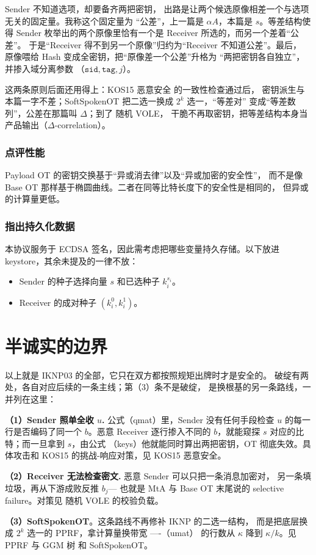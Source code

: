 Sender 不知道选项，却要备齐两把密钥，
出路是让两个候选原像相差一个与选项无关的固定量。我称这个固定量为
“公差”，上一篇是 $\alpha A$，本篇是 $s$。等差结构使得 Sender
枚举出的两个原像里恰有一个是 Receiver 所选的，而另一个差着“公差”。
于是“Receiver 得不到另一个原像”归约为“Receiver 不知道公差”。最后，
原像喂给 Hash 变成全密钥，把“原像差一个公差”升格为
“两把密钥各自独立”，并掺入域分离参数
（$\mathtt{sid}, \mathtt{tag}, j$）。

这两条原则后面还用得上：KOS15 恶意安全 的一致性检查通过后，
密钥派生与本篇一字不差；SoftSpokenOT 把二选一换成 $2^k$ 选一，“等差对”
变成“等差数列”，公差在那篇叫 $\Delta$；到了 随机 VOLE，
干脆不再取密钥，把等差结构本身当产品输出（$\Delta$-correlation）。

\subsubsection{点评性能}

Payload OT 的密钥交换基于“异或消去律”以及“异或加密的安全性”，
而不是像 Base OT 那样基于椭圆曲线。二者在同等比特长度下的安全性是相同的，
但异或的计算量更低。

\subsubsection{指出持久化数据}

本协议服务于 ECDSA 签名，因此需考虑把哪些变量持久存储。以下放进
keystore，其余未提及的一律不放：

\begin{itemize}

\item
  Sender 的种子选择向量 $s$ 和已选种子 $k_i^{s_i}$。
\item
  Receiver 的成对种子 $(k_i^0, k_i^1)$。
\end{itemize}

\section{半诚实的边界}

以上就是 IKNP03 的全部，它只在双方都按照规矩出牌时才是安全的。
破绽有两处，各自对应后续的一条主线；第（3）条不是破绽，
是换根基的另一条路线，一并列在这里：

\textbf{（1）Sender 照单全收 $u$.} 公式（qmat）里，Sender
没有任何手段检查 $u$ 的每一行是否编码了同一个 $b$。恶意 Receiver
逐行掺入不同的 $b$，就能窥探 $s$ 对应的比特；而一旦拿到 $s$，由公式
（keys）他就能同时算出两把密钥，OT 彻底失效。具体攻击和 KOS15
的挑战-响应对策，见 KOS15 恶意安全。

\textbf{（2）Receiver 无法检查密文.} 恶意 Sender 可以只把一条消息加密对，
另一条填垃圾，再从下游成败反推 $b_j$--- 也就是 MtA 与 Base OT 末尾说的
selective failure。对策见 随机 VOLE 的校验负载。

\textbf{（3）SoftSpokenOT}。这条路线不再修补 IKNP 的二选一结构，
而是把底层换成 $2^k$ 选一的 PPRF，拿计算量换带宽 ----（umat）
的行数从 $\kappa$ 降到 $\kappa/k$。见 PPRF 与 GGM 树 和 SoftSpokenOT。
